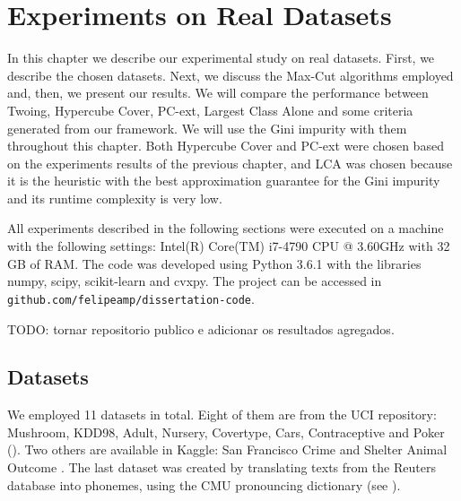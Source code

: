 \newpage

\chapter{Experiments on Real Datasets}
\label{chap:experiments-datasets}


In this chapter we describe our experimental study on real datasets. First, we describe the chosen datasets. Next, we discuss the Max-Cut algorithms 
employed and, then, we present our results. We will compare the performance between Twoing, Hypercube Cover, PC-ext, Largest Class Alone and some criteria generated from our framework. We will use the Gini impurity with them throughout this chapter. Both Hypercube Cover and PC-ext were chosen based on the experiments results of the previous chapter, and LCA was chosen because it is the heuristic with the best approximation guarantee for the Gini impurity and its runtime complexity is very low. 

All  experiments described in the following sections were executed on a machine with the following settings: Intel(R) Core(TM) i7-4790 CPU @ 3.60GHz with 32 GB of RAM. The code was developed using Python 3.6.1 with the libraries numpy, scipy, scikit-learn and cvxpy.
The project can be accessed in {\tt github.com/felipeamp/dissertation-code}.

TODO: tornar repositorio publico e adicionar os resultados agregados.

\section{Datasets}
We employed 11 datasets in total. Eight of them are from the UCI repository:
Mushroom, KDD98, Adult, Nursery, Covertype, Cars, Contraceptive and Poker (\cite{Lichman:2013}).
Two others are available in Kaggle: San Francisco Crime and Shelter Animal Outcome
\cite{SFC,AnimalShelter}. The last dataset was created by translating texts from the Reuters database \cite{Lichman:2013} into phonemes, using the CMU pronouncing dictionary (see \cite{CMU-PD}).

